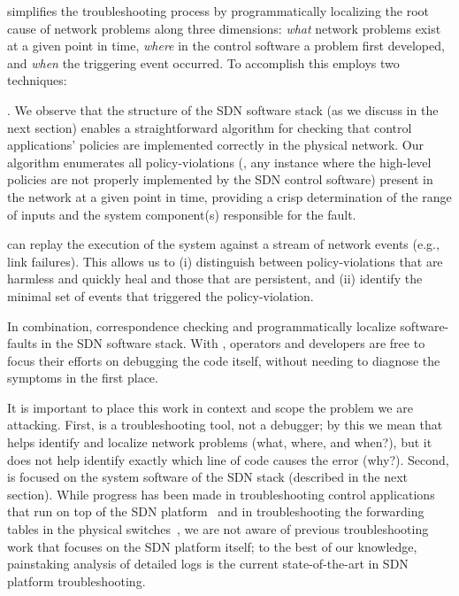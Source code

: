 \projectname{} simplifies the troubleshooting process by programmatically localizing the root cause
of network problems along three dimensions: {\it what} network problems exist at a
given point in time, {\it where} in the control software a problem first developed, and
{\it when} the triggering event occurred. To accomplish this
\projectname{} employs two techniques:

. We observe that the structure of the
SDN software stack (as we discuss in the next section) enables a straightforward algorithm for
checking that control applications' policies are implemented correctly in
the physical network. Our algorithm enumerates all policy-violations
(\ie{}, any instance where the high-level policies are not properly
implemented by the SDN control software) present in the network at a given point in
time, providing a crisp determination of the range of inputs
and the system component(s) responsible for the fault.

 \projectname{} can replay the execution of the
system against
a stream of network events (e.g., link failures). This allows us to (i)
distinguish between policy-violations that are harmless and quickly heal and
those that are persistent, and (ii) identify the minimal set of events that triggered
the policy-violation.


In combination, correspondence checking and \simulator{} programmatically
localize software-faults in the SDN software stack.
With \projectname{}, operators and developers are free to focus their efforts
on debugging the code itself, without needing to
diagnose the symptoms in the first place.

It is important to place this work in context and scope the problem we are
attacking. First, \projectname{} is a troubleshooting tool, not a debugger; by
this we mean that \projectname{} helps identify and localize network
problems (what, where, and when?), but it does not help identify exactly which
line of code causes the error (why?). Second, \projectname{} is focused on the
system software of the SDN stack (described in the next section). While progress has been made in troubleshooting control
applications that run on top of the SDN platform~\cite{nice} and in troubleshooting the forwarding tables in the physical switches~\cite{anteater,hsa}, we
are not aware of previous troubleshooting work that focuses on the SDN
platform itself; to the best of our knowledge, painstaking analysis of detailed logs is the current state-of-the-art in SDN platform troubleshooting.


